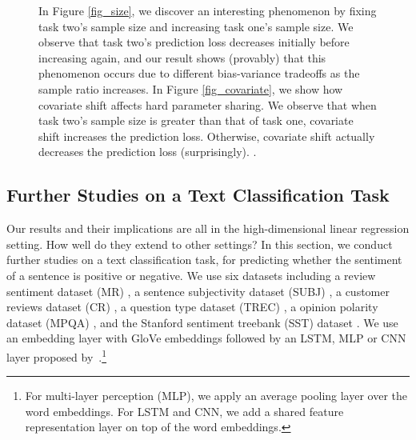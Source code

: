 \begin{figure}[!t]
{	In Figure \ref{fig_size}, we discover an interesting phenomenon by fixing task two's sample size and increasing task one's sample size.
	We observe that task two's prediction loss decreases initially before increasing again, and our result shows (provably) that this phenomenon occurs due to different bias-variance tradeoffs as the sample ratio increases.
	In Figure \ref{fig_covariate}, we show how covariate shift affects hard parameter sharing. We observe that when task two's sample size is greater than that of task one, covariate shift increases the prediction loss. Otherwise, covariate shift actually decreases the prediction loss (surprisingly).
	.}
	\label{fig_model_shift_phasetrans}
\end{figure}


\subsection{Further Studies on a Text Classification Task}\label{sec_text}

Our results and their implications are all in the high-dimensional linear regression setting.
How well do they extend to other settings?
In this section, we conduct further studies on a text classification task, for predicting whether the sentiment of a sentence is positive or negative.
We use six datasets including a review sentiment dataset (MR) \cite{pang2005seeing}, a sentence subjectivity dataset (SUBJ) \cite{pang2004sentimental}, a customer reviews dataset (CR) \cite{hu2004mining}, a question type dataset (TREC) \cite{li2002learning}, a opinion polarity dataset (MPQA) \cite{wiebe2005annotating}, and the Stanford sentiment treebank (SST) dataset \cite{socher2013recursive}.
We use an embedding layer with GloVe embeddings \cite{pennington2014glove} followed by an LSTM, MLP or CNN layer proposed by~\citet{lei2018simple}.\footnote{For multi-layer perception (MLP), we apply an average pooling layer over the word embeddings. For LSTM and CNN, we add a shared feature representation layer on top of the word embeddings.}

